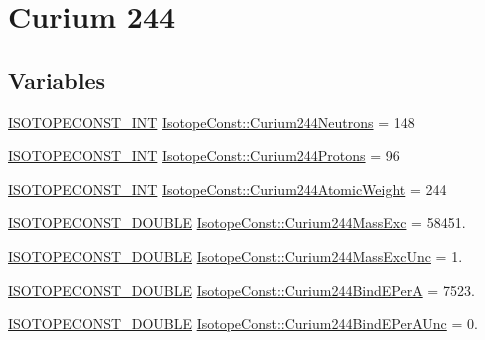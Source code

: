 \hypertarget{group___isotope_const-_curium-_cm244}{}\section{Curium 244}
\label{group___isotope_const-_curium-_cm244}
\subsection*{Variables}
\begin{DoxyCompactItemize}
\item 
\mbox{\hyperlink{group___isotope_const-_macros_ga5f18360b3e99483a35c32d789e62621c}{I\+S\+O\+T\+O\+P\+E\+C\+O\+N\+S\+T\+\_\+\+I\+NT}} \mbox{\hyperlink{group___isotope_const-_curium-_cm244_ga37e3292c6437b179f1ad5e6a0d2c1367}{Isotope\+Const\+::\+Curium244\+Neutrons}} = 148
\item 
\mbox{\hyperlink{group___isotope_const-_macros_ga5f18360b3e99483a35c32d789e62621c}{I\+S\+O\+T\+O\+P\+E\+C\+O\+N\+S\+T\+\_\+\+I\+NT}} \mbox{\hyperlink{group___isotope_const-_curium-_cm244_gae7385e24d9daef379ee79dd0d7be36ac}{Isotope\+Const\+::\+Curium244\+Protons}} = 96
\item 
\mbox{\hyperlink{group___isotope_const-_macros_ga5f18360b3e99483a35c32d789e62621c}{I\+S\+O\+T\+O\+P\+E\+C\+O\+N\+S\+T\+\_\+\+I\+NT}} \mbox{\hyperlink{group___isotope_const-_curium-_cm244_ga6f392c7c86dd1a341e397559535db9f0}{Isotope\+Const\+::\+Curium244\+Atomic\+Weight}} = 244
\item 
\mbox{\hyperlink{group___isotope_const-_macros_ga8f45a7272ce02c0b4c65c44636ed719a}{I\+S\+O\+T\+O\+P\+E\+C\+O\+N\+S\+T\+\_\+\+D\+O\+U\+B\+LE}} \mbox{\hyperlink{group___isotope_const-_curium-_cm244_ga822d2886d1b182b43ed9b9fb29589bf2}{Isotope\+Const\+::\+Curium244\+Mass\+Exc}} = 58451.
\item 
\mbox{\hyperlink{group___isotope_const-_macros_ga8f45a7272ce02c0b4c65c44636ed719a}{I\+S\+O\+T\+O\+P\+E\+C\+O\+N\+S\+T\+\_\+\+D\+O\+U\+B\+LE}} \mbox{\hyperlink{group___isotope_const-_curium-_cm244_gaed4f263b939aa52ced9a2a00c71fde1c}{Isotope\+Const\+::\+Curium244\+Mass\+Exc\+Unc}} = 1.
\item 
\mbox{\hyperlink{group___isotope_const-_macros_ga8f45a7272ce02c0b4c65c44636ed719a}{I\+S\+O\+T\+O\+P\+E\+C\+O\+N\+S\+T\+\_\+\+D\+O\+U\+B\+LE}} \mbox{\hyperlink{group___isotope_const-_curium-_cm244_ga4a7daf0b13b9ddcf9f80825371e2635b}{Isotope\+Const\+::\+Curium244\+Bind\+E\+PerA}} = 7523.
\item 
\mbox{\hyperlink{group___isotope_const-_macros_ga8f45a7272ce02c0b4c65c44636ed719a}{I\+S\+O\+T\+O\+P\+E\+C\+O\+N\+S\+T\+\_\+\+D\+O\+U\+B\+LE}} \mbox{\hyperlink{group___isotope_const-_curium-_cm244_gac573163d1397084f1c28cc5f395ee2ce}{Isotope\+Const\+::\+Curium244\+Bind\+E\+Per\+A\+Unc}} = 0.

\end{DoxyCompactItemize}
